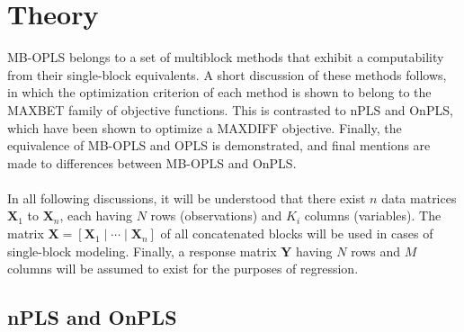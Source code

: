 \section{Theory}

\begin{doublespace}
MB-OPLS belongs to a set of multiblock methods that exhibit a computability
from their single-block equivalents. A short discussion of these methods
follows, in which the optimization criterion of each method is shown to
belong to the MAXBET family of objective functions. This is contrasted to
nPLS and OnPLS, which have been shown to optimize a MAXDIFF objective.
Finally, the equivalence of MB-OPLS and OPLS is demonstrated, and final
mentions are made to differences between MB-OPLS and OnPLS.
\\\\
In all following discussions, it will be understood that there exist $n$
data matrices $\mathbf{X}_1$ to $\mathbf{X}_n$, each having $N$ rows
(observations) and $K_i$ columns (variables). The matrix
$\mathbf{X} = [\mathbf{X}_1\mid\cdots\mid\mathbf{X}_n]$ of all concatenated
blocks will be used in cases of single-block modeling. Finally, a response
matrix $\mathbf{Y}$ having $N$ rows and $M$ columns will be assumed to exist
for the purposes of regression.
\end{doublespace}

\subsection{nPLS and OnPLS}


